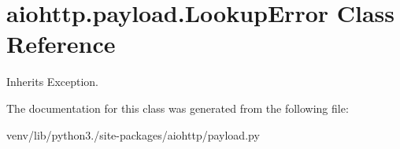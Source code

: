 \hypertarget{classaiohttp_1_1payload_1_1_lookup_error}{}\section{aiohttp.\+payload.\+Lookup\+Error Class Reference}
\label{classaiohttp_1_1payload_1_1_lookup_error}


Inherits Exception.



The documentation for this class was generated from the following file\+:\begin{DoxyCompactItemize}
\item 
venv/lib/python3./site-\/packages/aiohttp/payload.\+py\end{DoxyCompactItemize}
